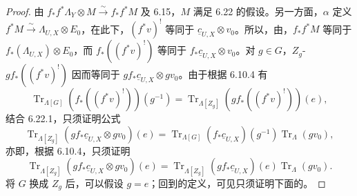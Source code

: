 \begin{proof}由 $f_*f^*\Lambda_Y\otimes M\xrightarrow\sim f_*f^*M$ 及 6.15，$M$ 满足 6.22 的假设。另一方面，$\alpha$ 定义 $f^*M\xrightarrow\sim\Lambda_{U,X}\otimes E_0$，在此下，$(f^*v)^!$ 等同于 $\underline c_{U,X}\otimes v_0$。所以，由，$f_*f^*M$ 等同于 $f_*(\Lambda_{U,X})\otimes E_0$，而 $f_*((f^*v)^!)$ 等同于 $f_*\underline c_{U,X}\otimes v_0$。对 $g\in G$，$Z_g$- $gf_*((f^*v)^!)$ 因而等同于 $gf_*\underline c_{U,X}\otimes gv_0$。由于根据 6.10.4 有
\[\operatorname{Tr}_{\Lambda[G]}(f_*((f^*v)^!))(g^{-1})=\operatorname{Tr}_{\Lambda[Z_g]}(gf_*((f^*v)^!))(e),\]
结合 6.22.1，只须证明公式
\[\operatorname{Tr}_{\Lambda[Z_g]}(gf_*\underline c_{U,X}\otimes gv_0)(e)=\operatorname{Tr}_{\Lambda[G]}(f_*\underline c_{U,X})(g^{-1})\operatorname{Tr}_\Lambda(gv_0),\]
亦即，根据 6.10.4，只须证明
\begin{equation}\operatorname{Tr}_{\Lambda[Z_g]}(gf_*\underline c_{U,X}\otimes gv_0)(e)=\operatorname{Tr}_{\Lambda[Z_g]}(gf_*\underline c_{U,X})(e)\operatorname{Tr}_\Lambda(gv_0).\tag{6.23.2}\end{equation}
将 $G$ 换成 $Z_g$ 后，可以假设 $g=e$；回到的定义，可见只须证明下面的。\end{proof}

